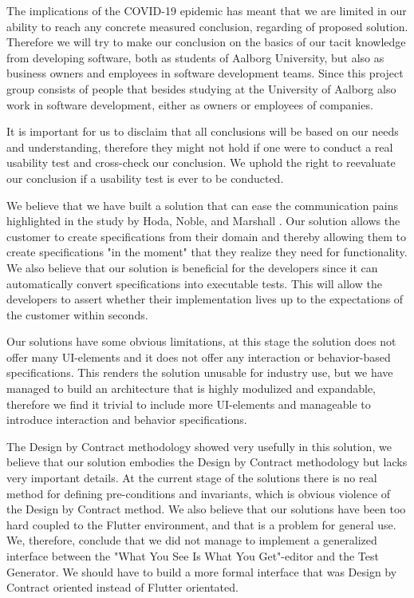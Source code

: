 The implications of the COVID-19 epidemic has meant that we are limited in our ability to reach any concrete measured conclusion, regarding of proposed solution.
Therefore we will try to make our conclusion on the basics of our tacit knowledge from developing software, both as students of Aalborg University, but also as business owners and employees in software development teams.
Since this project group consists of people that besides studying at the University of Aalborg also work in software development, either as owners or employees of companies.

It is important for us to disclaim that all conclusions will be based on our needs and understanding, therefore they might not hold if one were to conduct a real usability test and cross-check our conclusion.
We uphold the right to reevaluate our conclusion if a usability test is ever to be conducted.

We believe that we have built a solution that can ease the communication pains highlighted in the study by Hoda, Noble, and Marshall \cite{Hoda2011TheIO}. 
Our solution allows the customer to create specifications from their domain and thereby allowing them to create specifications "in the moment" that they realize they need for functionality.
We also believe that our solution is beneficial for the developers since it can automatically convert specifications into executable tests.
This will allow the developers to assert whether their implementation lives up to the expectations of the customer within seconds.

Our solutions have some obvious limitations, at this stage the solution does not offer many UI-elements and it does not offer any interaction or behavior-based specifications.
This renders the solution unusable for industry use, but we have managed to build an architecture that is highly modulized and expandable, therefore we find it trivial to include more UI-elements and manageable to introduce interaction and behavior specifications.

The Design by Contract methodology showed very usefully in this solution, we believe that our solution embodies the Design by Contract methodology but lacks very important details.
At the current stage of the solutions there is no real method for defining pre-conditions and invariants, which is obvious violence of the Design by Contract method.
We also believe that our solutions have been too hard coupled to the Flutter environment, and that is a problem for general use. 
We, therefore, conclude that we did not manage to implement a generalized interface between the "What You See Is What You Get"-editor and the Test Generator.
We should have to build a more formal interface that was Design by Contract oriented instead of Flutter orientated.